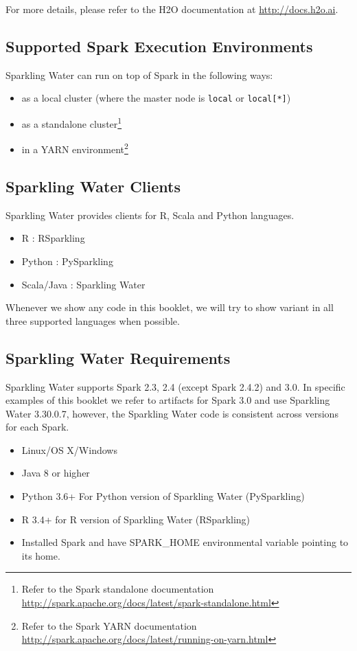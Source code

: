 \documentclass{standalone}
\begin{document}
    For more details, please refer to the H2O documentation at {\url{http://docs.h2o.ai}}.

    \subsection{Supported Spark Execution Environments}

    Sparkling Water can run on top of Spark in the following ways:
    \begin{itemize}
        \item as a local cluster (where the master node is \texttt{local} or \texttt{local[*]})
        \item as a standalone cluster\footnote{Refer to the Spark standalone documentation
        \url{http://spark.apache.org/docs/latest/spark-standalone.html}}
        \item in a YARN environment\footnote{Refer to the Spark YARN documentation \url{http://spark.apache.org/docs/latest/running-on-yarn.html}}
    \end{itemize}

    \subsection{Sparkling Water Clients}

    Sparkling Water provides clients for R, Scala and Python languages.

    \begin{itemize}
        \item R : RSparkling
        \item Python : PySparkling
        \item Scala/Java : Sparkling Water
    \end{itemize}

    Whenever we show any code in this booklet, we will try to show variant in all three supported languages when possible.

    \subsection{Sparkling Water Requirements}

    Sparkling Water supports Spark 2.3, 2.4 (except Spark 2.4.2) and 3.0. In specific examples of this
    booklet we refer to artifacts for Spark 3.0 and use Sparkling Water 3.30.0.7, however, the Sparkling Water code is
    consistent across versions for each Spark.

    \begin{itemize}
        \item Linux/OS X/Windows
        \item Java 8 or higher
        \item Python 3.6+ For Python version of Sparkling Water (PySparkling)
        \item R 3.4+ for R version of Sparkling Water (RSparkling)
        \item Installed Spark and have SPARK\_HOME environmental variable pointing to its home.
    \end{itemize}
\end{document}
